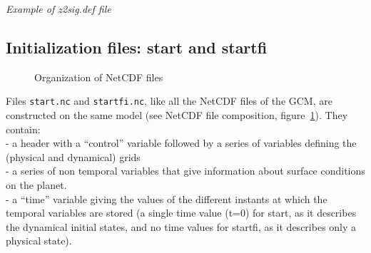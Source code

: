 \noindent
{\it Example of  z2sig.def file}


\subsection{Initialization files: start and startfi}

%
\begin{figure}[h]
\centering
{}
\caption{Organization of NetCDF files \label{fg:netcdf}}
\end{figure}
%
Files {\tt start.nc} and {\tt startfi.nc}, like all the NetCDF files of
the GCM,
are constructed on the same model (see NetCDF file composition,
figure~\ref{fg:netcdf}). They contain:\\
- a header with a ``control'' variable followed by a series of variables
defining the (physical and dynamical) grids \\
- a series of non temporal variables that give information about surface
conditions on the planet.\\
- a ``time'' variable giving the values of the different instants at which
the temporal variables are stored
(a single time value (t=0) for start,
as it describes the dynamical initial states,
and no time values for startfi, as it describes only a physical state).\\

